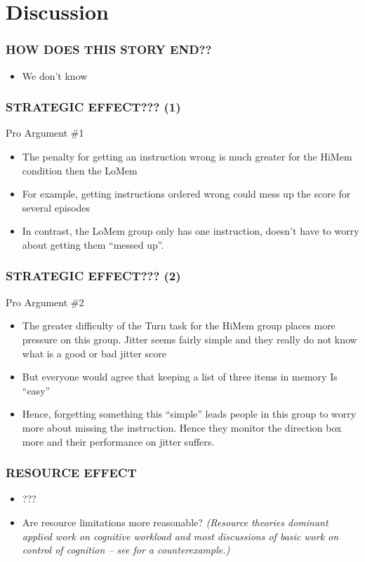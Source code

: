 \documentclass{beamer}
\begin{document}
\section{Discussion}

\begin{frame} 
	\frametitle{HOW DOES THIS STORY END??}
	\begin{itemize}
		\item We don't know
 	\end{itemize}
\end{frame}

\begin{frame} 
	\frametitle{STRATEGIC EFFECT??? (1)}
	Pro Argument \#1
	\begin{itemize}[<+-| alert@+>]
		\item The penalty for getting an instruction wrong is much greater for the HiMem condition then the LoMem
		\item For example, getting instructions ordered wrong could mess up the score for several episodes
		\item In contrast, the LoMem group only has one instruction, doesn't have to worry about getting them ``messed up''. 
 	\end{itemize}
\end{frame}

\begin{frame} 
	\frametitle{STRATEGIC EFFECT??? (2)}
	Pro Argument \#2
		\begin{itemize}[<+-| alert@+>]
		\item The greater difficulty of the Turn task for the HiMem group places more pressure on this group. Jitter seems fairly simple and they really do not know what is a good or bad jitter score
		\item But everyone would agree that keeping a list of three items in memory Is ``easy''
		\item Hence, forgetting something this ``simple'' leads people in this group to worry more about missing the instruction. Hence they monitor the direction box more and their performance on jitter suffers.
	\end{itemize}
\end{frame}

\begin{frame}
	\frametitle{RESOURCE EFFECT}
	\begin{itemize}[<+-| alert@+>]
		\item ???
		\item Are resource limitations more reasonable? \emph{(Resource theories dominant applied work on cognitive workload and most discussions of basic work on control of cognition -- see \textcite{erik08pr.article} for a counterexample.)}
	\end{itemize}
\end{frame}
\end{document}
